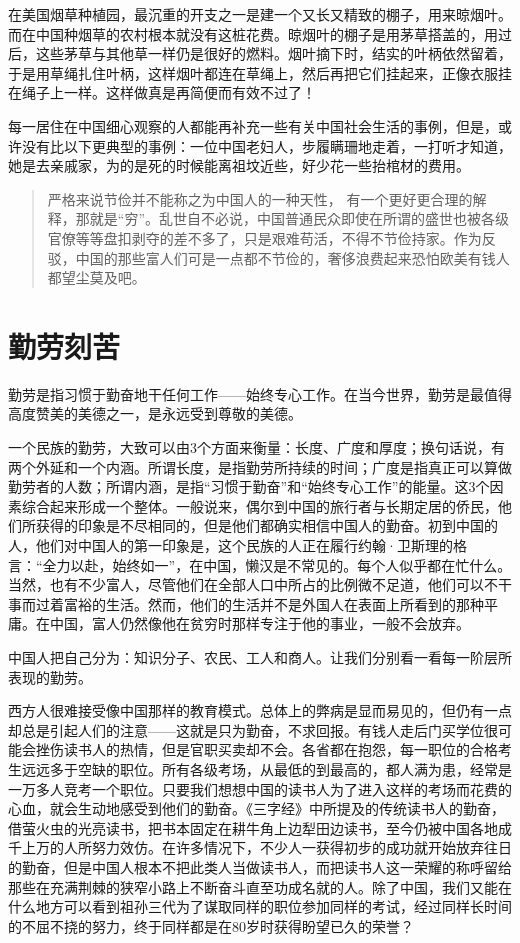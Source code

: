 \documentclass[12pt,oneside]{book}
\begin{document}
\begin{common-format}
在美国烟草种植园，最沉重的开支之一是建一个又长又精致的棚子，用来晾烟叶。而在中国种烟草的农村根本就没有这桩花费。晾烟叶的棚子是用茅草搭盖的，用过后，这些茅草与其他草一样仍是很好的燃料。烟叶摘下时，结实的叶柄依然留着，于是用草绳扎住叶柄，这样烟叶都连在草绳上，然后再把它们挂起来，正像衣服挂在绳子上一样。这样做真是再简便而有效不过了！ 

每一居住在中国细心观察的人都能再补充一些有关中国社会生活的事例，但是，或许没有比以下更典型的事例：一位中国老妇人，步履瞒珊地走着，一打听才知道，她是去亲戚家，为的是死的时候能离祖坟近些，好少花一些抬棺材的费用。

\begin{quotation}
严格来说节俭并不能称之为中国人的一种天性， 有一个更好更合理的解释，那就是“穷”。乱世自不必说，中国普通民众即使在所谓的盛世也被各级官僚等等盘扣剥夺的差不多了，只是艰难苟活，不得不节俭持家。作为反驳，中国的那些富人们可是一点都不节俭的，奢侈浪费起来恐怕欧美有钱人都望尘莫及吧。
\end{quotation}

\chapter{勤劳刻苦}
勤劳是指习惯于勤奋地干任何工作——始终专心工作。在当今世界，勤劳是最值得高度赞美的美德之一，是永远受到尊敬的美德。 

一个民族的勤劳，大致可以由3个方面来衡量：长度、广度和厚度；换句话说，有两个外延和一个内涵。所谓长度，是指勤劳所持续的时间；广度是指真正可以算做勤劳者的人数；所谓内涵，是指“习惯于勤奋”和“始终专心工作”的能量。这3个因素综合起来形成一个整体。一般说来，偶尔到中国的旅行者与长期定居的侨民，他们所获得的印象是不尽相同的，但是他们都确实相信中国人的勤奋。初到中国的人，他们对中国人的第一印象是，这个民族的人正在履行约翰·卫斯理的格言：“全力以赴，始终如一”，在中国，懒汉是不常见的。每个人似乎都在忙什么。当然，也有不少富人，尽管他们在全部人口中所占的比例微不足道，他们可以不干事而过着富裕的生活。然而，他们的生活并不是外国人在表面上所看到的那种平庸。在中国，富人仍然像他在贫穷时那样专注于他的事业，一般不会放弃。 

中国人把自己分为：知识分子、农民、工人和商人。让我们分别看一看每一阶层所表现的勤劳。 

西方人很难接受像中国那样的教育模式。总体上的弊病是显而易见的，但仍有一点却总是引起人们的注意——这就是只为勤奋，不求回报。有钱人走后门买学位很可能会挫伤读书人的热情，但是官职买卖却不会。各省都在抱怨，每一职位的合格考生远远多于空缺的职位。所有各级考场，从最低的到最高的，都人满为患，经常是一万多人竞考一个职位。只要我们想想中国的读书人为了进入这样的考场而花费的心血，就会生动地感受到他们的勤奋。《三字经》中所提及的传统读书人的勤奋，借萤火虫的光亮读书，把书本固定在耕牛角上边犁田边读书，至今仍被中国各地成千上万的人所努力效仿。在许多情况下，不少人一获得初步的成功就开始放弃往日的勤奋，但是中国人根本不把此类人当做读书人，而把读书人这一荣耀的称呼留给那些在充满荆棘的狭窄小路上不断奋斗直至功成名就的人。除了中国，我们又能在什么地方可以看到祖孙三代为了谋取同样的职位参加同样的考试，经过同样长时间的不屈不挠的努力，终于同样都是在80岁时获得盼望已久的荣誉？ 


\end{common-format}
\end{document}
